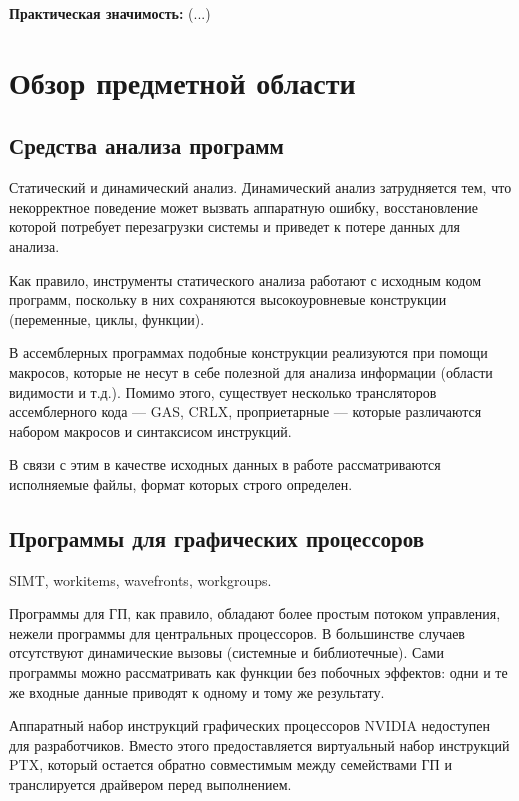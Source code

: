 \documentclass[a4paper,14pt]{extarticle}
\begin{document}
\textbf{Практическая значимость:} (...)

\section{Обзор предметной области}

\subsection{Средства анализа программ}

Статический и динамический анализ. Динамический анализ затрудняется тем, что некорректное
поведение может вызвать аппаратную ошибку, восстановление которой потребует перезагрузки
системы и приведет к потере данных для анализа.  %

Как правило, инструменты статического анализа работают с исходным кодом программ,
поскольку в них сохраняются высокоуровневые конструкции (переменные, циклы, функции).

В ассемблерных программах подобные конструкции реализуются при помощи макросов,
которые не несут в себе полезной для анализа информации (области видимости и т.д.).
Помимо этого, существует несколько трансляторов ассемблерного кода — GAS, CRLX, проприетарные — которые
различаются набором макросов и синтаксисом инструкций.

В связи с этим в качестве исходных данных в работе рассматриваются исполняемые файлы,
формат которых строго определен.

\subsection{Программы для графических процессоров}

SIMT, workitems, wavefronts, workgroups.

Программы для ГП, как правило, обладают более простым потоком
управления, нежели программы для центральных процессоров. В большинстве случаев отсутствуют
динамические вызовы (системные и библиотечные). Сами программы можно рассматривать как
функции без побочных эффектов: одни и те же входные данные приводят к одному и тому же результату.

Аппаратный набор инструкций графических процессоров NVIDIA недоступен для разработчиков.
Вместо этого предоставляется виртуальный набор инструкций PTX, который остается
обратно совместимым между семействами ГП и транслируется драйвером перед выполнением.
\end{document}
